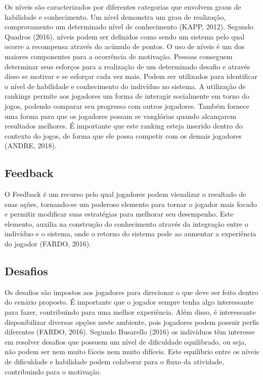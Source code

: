 \documentclass[
	12pt,				%
	oneside,			%
	a4paper,			%
	english,			%
	french,				%
	spanish,			%
	brazil,				%
	]{abntex2}
\begin{document}
	Os níveis são caracterizados por diferentes categorias que envolvem graus de habilidade e conhecimento. Um nível demonstra um grau de realização, comprovamento um determinado nível de conhecimento (KAPP, 2012). Segundo Quadros (2016), níveis podem ser definidos como sendo um sistema pelo qual ocorre a recompensa através do acúmulo de pontos.
	O uso de níveis é um dos maiores componentes para a ocorrência de motivação. Pessoas conseguem determinar seus esforços para a realização de um determinado desafio e através disso se motivar e se esforçar cada vez mais. Podem ser utilizados para identificar o nível de habilidade e conhecimento do indivíduo no sistema.
	A utilização de rankings permite aos jogadores um forma de interagir socialmente em torno do jogos, podendo comparar seu progresso com outros jogadores. Também fornece uma forma para que os jogadores possam se vanglórias quando alcançarem resultados melhores. É importante que este ranking esteja inserido dentro do contexto do jogos, de forma que ele possa competir com os demais jogadores (ANDRE, 2018).
    
\subsection{Feedback}            

	O Feedback é um recurso pelo qual jogadores podem visualizar o resultado de suas ações, tornando-se um poderoso elemento para tornar o jogador mais focado e permitir modificar suas estratégias para melhorar seu desempenho. Este elemento, auxilia na construção do conhecimento através da integração entre o indivíduo e o sistema, onde o retorno do sistema pode ao aumentar a experiência do jogador (FARDO, 2016).
    
\subsection{Desafios}                

	Os desafios são impostos aos jogadores para direcionar o que deve ser feito dentro do cenário proposto. É importante que o jogador sempre tenha algo interessante para fazer, contribuindo para uma melhor experiência. Além disso, é interessante disponibilizar diversas opções neste ambiente, pois jogadores podem possuir perfis diferentes (FARDO, 2016).
	Segundo Busarello (2016) os indivíduos têm interesse em resolver desafios que possuem um nível de dificuldade equilibrado, ou seja, não podem ser nem muito fáceis nem muito difíceis. Este equilíbrio entre os níveis de dificuldade e habilidade podem colaborar para o fluxo da atividade, contribuindo para o motivação.
    
\end{document}
